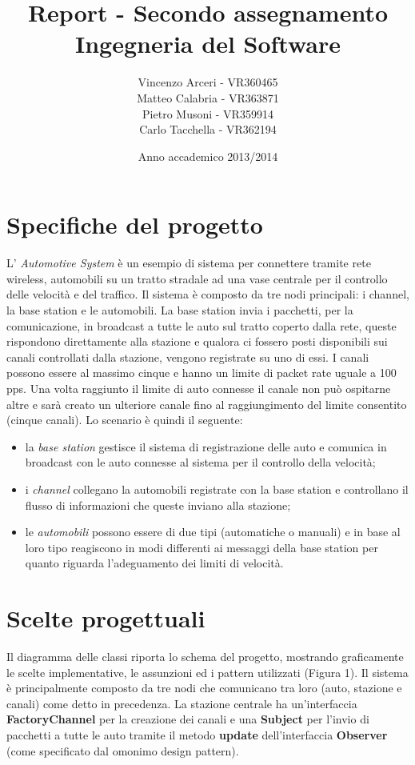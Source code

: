 \documentclass[a4paper,10pt]{article}
\begin{document}
\title{Report - Secondo assegnamento Ingegneria del Software}
\author{Vincenzo Arceri - VR360465\\
 Matteo Calabria - VR363871\\
 Pietro Musoni - VR359914\\ 
Carlo Tacchella - VR362194\\}
\date{Anno accademico 2013/2014}
\maketitle

\section{Specifiche del progetto}

L' \textit{Automotive System} è un esempio di sistema per connettere tramite rete wireless, automobili su un tratto stradale ad una vase centrale per il controllo delle velocità e del traffico. Il sistema è composto da tre nodi principali: i channel, la base station e le automobili. La base
station invia i pacchetti, per la comunicazione, in broadcast a tutte le auto sul tratto coperto dalla rete, queste rispondono direttamente alla stazione e qualora ci fossero posti disponibili sui canali controllati dalla stazione, vengono registrate su uno di essi. I canali possono essere al massimo cinque e hanno un limite di packet rate uguale a 100 pps. Una volta raggiunto il limite di auto connesse il canale non può ospitarne altre e sarà creato un ulteriore canale fino al raggiungimento del limite consentito (cinque canali).   
Lo scenario è quindi il seguente:
\begin{itemize}
\item la \textit{base station} gestisce il sistema di registrazione delle auto e comunica in broadcast con le auto connesse al sistema per il controllo della velocità;
\item i \textit{channel} collegano la automobili registrate con la base station e controllano il flusso di informazioni che queste inviano alla stazione;
\item le \textit{automobili} possono essere di due tipi (automatiche o manuali) e in base al loro tipo reagiscono in modi differenti ai messaggi della base station per quanto riguarda l'adeguamento dei limiti di velocità. 
\end{itemize}


\section{Scelte progettuali}
Il diagramma delle classi riporta lo schema del progetto, mostrando graficamente le scelte implementative, le assunzioni ed i pattern utilizzati (Figura 1). Il sistema è principalmente composto da tre nodi che comunicano tra loro (auto, stazione e canali) come detto in precedenza. La stazione centrale ha un'interfaccia \textbf{FactoryChannel} per la creazione dei canali e una \textbf{Subject} per l'invio di pacchetti a tutte le auto tramite il metodo \textbf{update} dell'interfaccia \textbf{Observer} (come specificato dal omonimo design pattern). 
\end{document}
